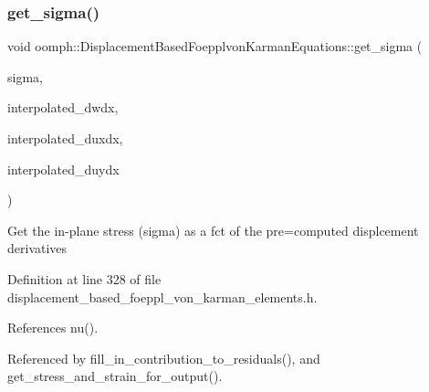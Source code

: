 \subsubsection{\texorpdfstring{get\+\_\+sigma()}{get\_sigma()}}
{\footnotesize\ttfamily void oomph\+::\+Displacement\+Based\+Foepplvon\+Karman\+Equations\+::get\+\_\+sigma (\begin{DoxyParamCaption}\item[{\hyperlink{classoomph_1_1DenseMatrix}{Dense\+Matrix}$<$ double $>$ \&}]{sigma,  }\item[{const \hyperlink{classoomph_1_1Vector}{Vector}$<$ double $>$ \&}]{interpolated\+\_\+dwdx,  }\item[{const \hyperlink{classoomph_1_1Vector}{Vector}$<$ double $>$ \&}]{interpolated\+\_\+duxdx,  }\item[{const \hyperlink{classoomph_1_1Vector}{Vector}$<$ double $>$ \&}]{interpolated\+\_\+duydx }\end{DoxyParamCaption})\hspace{0.3cm}{\ttfamily [inline]}}

Get the in-\/plane stress (sigma) as a fct of the pre=computed displcement derivatives 

Definition at line 328 of file displacement\+\_\+based\+\_\+foeppl\+\_\+von\+\_\+karman\+\_\+elements.\+h.



References nu().



Referenced by fill\+\_\+in\+\_\+contribution\+\_\+to\+\_\+residuals(), and get\+\_\+stress\+\_\+and\+\_\+strain\+\_\+for\+\_\+output().

\mbox{\label{classoomph_1_1DisplacementBasedFoepplvonKarmanEquations_a4382eef3eb303d5429d6b3edd1d1c6c5}} 
